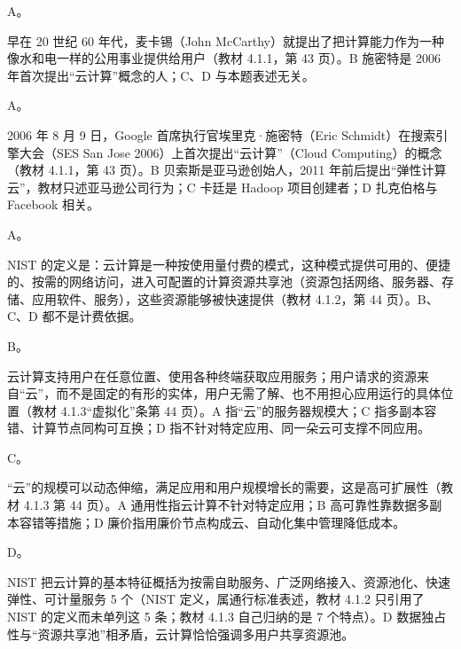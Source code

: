 \documentclass[a4paper,11pt]{article}
\begin{document}


\q A。\begin{analysis}早在 20 世纪 60 年代，麦卡锡（John McCarthy）就提出了把计算能力作为一种像水和电一样的公用事业提供给用户（教材 4.1.1，第 43 页）。B 施密特是 2006 年首次提出“云计算”概念的人；C、D 与本题表述无关。\end{analysis}

\q A。\begin{analysis}2006 年 8 月 9 日，Google 首席执行官埃里克·施密特（Eric Schmidt）在搜索引擎大会（SES San Jose 2006）上首次提出“云计算”（Cloud Computing）的概念（教材 4.1.1，第 43 页）。B 贝索斯是亚马逊创始人，2011 年前后提出“弹性计算云”，教材只述亚马逊公司行为；C 卡廷是 Hadoop 项目创建者；D 扎克伯格与 Facebook 相关。\end{analysis}

\q A。\begin{analysis}NIST 的定义是：云计算是一种按使用量付费的模式，这种模式提供可用的、便捷的、按需的网络访问，进入可配置的计算资源共享池（资源包括网络、服务器、存储、应用软件、服务），这些资源能够被快速提供（教材 4.1.2，第 44 页）。B、C、D 都不是计费依据。\end{analysis}

\q B。\begin{analysis}云计算支持用户在任意位置、使用各种终端获取应用服务；用户请求的资源来自“云”，而不是固定的有形的实体，用户无需了解、也不用担心应用运行的具体位置（教材 4.1.3“虚拟化”条第 44 页）。A 指“云”的服务器规模大；C 指多副本容错、计算节点同构可互换；D 指不针对特定应用、同一朵云可支撑不同应用。\end{analysis}

\q C。\begin{analysis}“云”的规模可以动态伸缩，满足应用和用户规模增长的需要，这是高可扩展性（教材 4.1.3 第 44 页）。A 通用性指云计算不针对特定应用；B 高可靠性靠数据多副本容错等措施；D 廉价指用廉价节点构成云、自动化集中管理降低成本。\end{analysis}

\q D。\begin{analysis}NIST 把云计算的基本特征概括为按需自助服务、广泛网络接入、资源池化、快速弹性、可计量服务 5 个（NIST 定义，属通行标准表述，教材 4.1.2 只引用了 NIST 的定义而未单列这 5 条；教材 4.1.3 自己归纳的是 7 个特点）。D 数据独占性与“资源共享池”相矛盾，云计算恰恰强调多用户共享资源池。\end{analysis}
\end{document}
